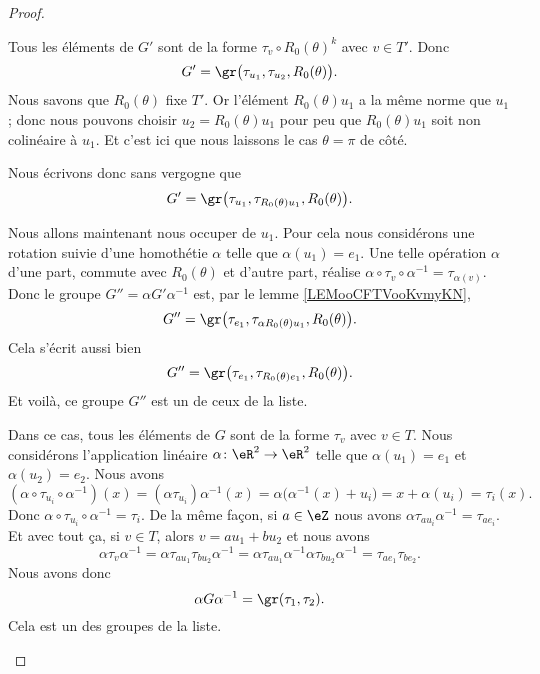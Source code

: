 \begin{proof}
\begin{subproof}
		Tous les éléments de \( G'\) sont de la forme \( \tau_v\circ R_0(\theta)^k\) avec \( v\in T'\). Donc
		\begin{equation}        \label{EQooUUDQooQpRcIi}
			G'=\gr\big(\tau_{u_1}, \tau_{u_2}, R_0(\theta)\big).
		\end{equation}
		Nous savons que \( R_0(\theta)\) fixe \( T'\). Or l'élément \( R_0(\theta)u_1\) a la même norme que \( u_1\); donc nous pouvons choisir \( u_2=R_0(\theta)u_1\) pour peu que \( R_0(\theta)u_1\) soit non colinéaire à \( u_1\). Et c'est ici que nous laissons le cas \( \theta=\pi\) de côté.

		Nous écrivons donc sans vergogne que
		\begin{equation}
			G'=\gr\big(\tau_{u_1}, \tau_{R_0(\theta)u_1}, R_0(\theta)\big).
		\end{equation}

		Nous allons maintenant nous occuper de \( u_1\). Pour cela nous considérons une rotation suivie d'une homothétie \( \alpha\) telle que \( \alpha(u_1)=e_1\). Une telle opération \( \alpha\) d'une part, commute avec \( R_0(\theta)\) et d'autre part, réalise \( \alpha\circ \tau_v\circ\alpha^{-1}=\tau_{\alpha(v)}\). Donc le groupe \( G''=\alpha G'\alpha^{-1}\) est, par le lemme \ref{LEMooCFTVooKvmyKN},
		\begin{equation}
			G''=\gr\big( \tau_{e_1}, \tau_{\alpha R_0(\theta)u_1}, R_0(\theta) \big).
		\end{equation}
		Cela s'écrit aussi bien
		\begin{equation}
			G''=\gr\big( \tau_{e_1}, \tau_{R_0(\theta)e_1}, R_0(\theta) \big).
		\end{equation}
		Et voilà, ce groupe \( G''\) est un de ceux de la liste.

		\spitem[Le cas \( L=\{ \id \}\)]
		Dans ce cas, tous les éléments de \( G\) sont de la forme \( \tau_v\) avec \( v\in T\). Nous considérons l'application linéaire \( \alpha\colon \eR^2\to \eR^2\) telle que \( \alpha(u_1)=e_1\) et \( \alpha(u_2)=e_2\). Nous avons
		\begin{equation}
			(\alpha\circ \tau_{u_i}\circ \alpha^{-1})(x)=(\alpha\tau_{u_i})\alpha^{-1}(x)=\alpha\big( \alpha^{-1}(x)+u_i \big)=x+\alpha(u_i)=\tau_i(x).
		\end{equation}
		Donc \( \alpha\circ \tau_{u_i}\circ \alpha^{-1}=\tau_i\). De la même façon, si \( a\in \eZ\) nous avons \( \alpha\tau_{au_i}\alpha^{-1}=\tau_{ae_i}\). Et avec tout ça, si \( v\in T\), alors \( v=au_1+bu_2\) et nous avons
		\begin{equation}
			\alpha\tau_v\alpha^{-1}=\alpha\tau_{au_1}\tau_{bu_2}\alpha^{-1}=\alpha\tau_{au_1}\alpha^{-1}\alpha\tau_{bu_2}\alpha^{-1}=\tau_{ae_1}\tau_{be_2}.
		\end{equation}
		Nous avons donc
		\begin{equation}
			\alpha G\alpha^{-1}=\gr(\tau_1,\tau_2).
		\end{equation}
		Cela est un des groupes de la liste.


\end{subproof}
\end{proof}
